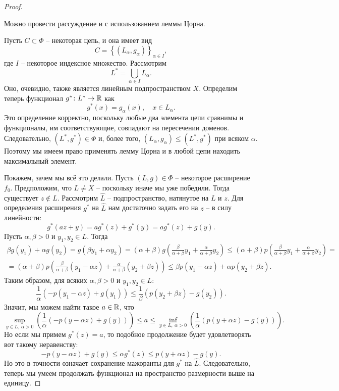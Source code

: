 \begin{proof}
    \begin{notet}
        Можно провести рассуждение и с использованием леммы Цорна.

        Пусть $C \subset \Phi$ -- некоторая цепь, и она имеет вид
        \[
            C = \left\{ (L_\alpha, g_\alpha) \right\}_{\alpha \in I},
        \]
        где $I$ -- некоторое индексное множество.
        Рассмотрим
        \[
            L^* = \bigcup_{\alpha \in I} L_{\alpha}.
        \]
        Оно, очевидно, также является линейным подпространством $X$.
        Определим теперь функционал $g^*\colon L^* \to \mathbb{R}$ как
        \[
            g^*(x) = g_{\alpha}(x), \quad x \in L_{\alpha}.
        \]
        Это определение корректно, поскольку любые два элемента цепи сравнимы и функционалы, им соответствующие, совпадают на пересечении доменов.
        Следовательно, $(L^*, g^*) \in \Phi$ и, более того, $(L_\alpha, g_\alpha) \leq (L^*, g^*)$ при всяком $\alpha$.
        Поэтому мы имеем право применять лемму Цорна и в любой цепи находить максимальный элемент.

    \end{notet}

    Покажем, зачем мы всё это делали.
    Пусть $(L, g) \in \Phi$ -- некоторое расширение $f_0$.
    Предположим, что $L \neq X$ -- поскольку иначе мы уже победили.
    Тогда существует $z \notin L$.
    Рассмотрим $\hat{L}$ -- подпространство, натянутое на $L$ и $z$.
    Для определения расширения $g^*$ на $\hat{L}$ нам достаточно задать его на $z$ -- в силу линейности:
    \[
        g^*(a z + y) = a g^*(z) + g^*(y) = a g^*(z) + g(y).
    \]
    Пусть $\alpha, \beta > 0$ и $y_1, y_2 \in L$.
    Тогда
    \begin{multline*}
        \beta g(y_1) + \alpha g(y_2) = g(\beta y_1 + \alpha y_2) = (\alpha + \beta) g\left( \frac{\beta}{\alpha + \beta}y_1 + \frac{\alpha}{\alpha + \beta} y_2\right) \leq (\alpha + \beta) p\left( \frac{\beta}{\alpha + \beta}y_1 + \frac{\alpha}{\alpha + \beta} y_2\right) = \\
        = (\alpha + \beta)p\left(\frac{\beta}{\alpha + \beta}(y_1 - \alpha z) + \frac{\alpha}{\alpha + \beta} (y_2 + \beta z)\right) \leq \beta p(y_1 - \alpha z) + \alpha p(y_2 + \beta z).
    \end{multline*}
    Таким образом, для всяких $\alpha, \beta > 0$ и $y_1, y_2 \in L\colon$
    \[
        \frac{1}{\alpha}\left(-p(y_1 - \alpha z) + g(y_1)\right) \leq \frac{1}{\beta} \left( p(y_2 + \beta z) - g(y_2) \right).
    \]
    Значит, мы можем найти такое $a \in \mathbb{R}$, что
    \[
        \sup_{y \in L, \ \alpha > 0} \left(\frac{1}{\alpha}(-p(y - \alpha z) + g(y))\right) \leq a \leq \inf_{y \in L, \ \alpha > 0} \left(\frac{1}{\alpha}(p(y + \alpha z) - g(y))\right).
    \]
    Но если мы примем $g^*(z) = a$, то подобное продолжение будет удовлетворять вот такому неравенству:
    \[
        - p(y - \alpha z) + g(y) \leq  \alpha g^*(z) \leq p(y + \alpha z) - g(y).
    \]
    Но это в точности означает сохранение мажоранты для $g^*$ на $\hat{L}$.
    Следовательно, теперь мы умеем продолжать функционал на пространство размерности выше на единицу.


\end{proof}
